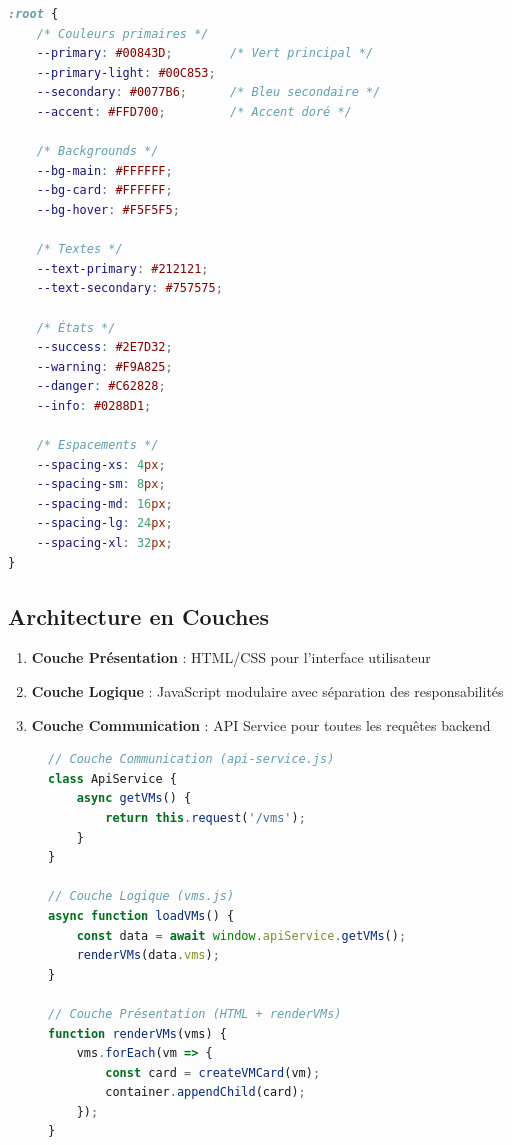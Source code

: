 \documentclass[12pt,a4paper]{article}
\begin{document}
\begin{lstlisting}[language=CSS,caption=Variables CSS principales (main.css)]
:root {
    /* Couleurs primaires */
    --primary: #00843D;        /* Vert principal */
    --primary-light: #00C853;
    --secondary: #0077B6;      /* Bleu secondaire */
    --accent: #FFD700;         /* Accent doré */
    
    /* Backgrounds */
    --bg-main: #FFFFFF;
    --bg-card: #FFFFFF;
    --bg-hover: #F5F5F5;
    
    /* Textes */
    --text-primary: #212121;
    --text-secondary: #757575;
    
    /* États */
    --success: #2E7D32;
    --warning: #F9A825;
    --danger: #C62828;
    --info: #0288D1;
    
    /* Espacements */
    --spacing-xs: 4px;
    --spacing-sm: 8px;
    --spacing-md: 16px;
    --spacing-lg: 24px;
    --spacing-xl: 32px;
}
\end{lstlisting}

\subsection{Architecture en Couches}

\begin{infobox}
\begin{enumerate}
    \item \textbf{Couche Présentation} : HTML/CSS pour l'interface utilisateur
    \item \textbf{Couche Logique} : JavaScript modulaire avec séparation des responsabilités
    \item \textbf{Couche Communication} : API Service pour toutes les requêtes backend
\end{enumerate}
\end{infobox}

\begin{figure}[H]
\centering
\begin{lstlisting}[language=JavaScript,caption=Exemple d'architecture modulaire]
// Couche Communication (api-service.js)
class ApiService {
    async getVMs() {
        return this.request('/vms');
    }
}

// Couche Logique (vms.js)
async function loadVMs() {
    const data = await window.apiService.getVMs();
    renderVMs(data.vms);
}

// Couche Présentation (HTML + renderVMs)
function renderVMs(vms) {
    vms.forEach(vm => {
        const card = createVMCard(vm);
        container.appendChild(card);
    });
}
\end{lstlisting}
\end{figure}
\end{document}
